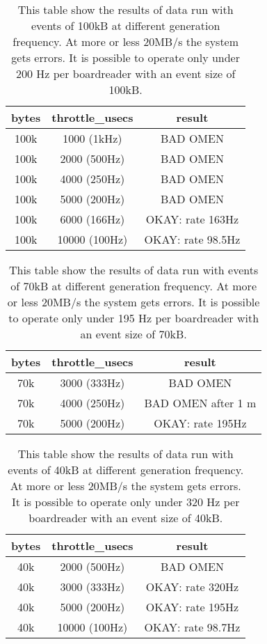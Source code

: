\documentclass[12pt]{article}
\begin{document}
\begin{center}  
\begin{table}[!h]
\centering
\begin{tabular}{c c c}
\hline
bytes & throttle\_usecs &  result\\
\hline
100k & 1000 (1kHz) & BAD OMEN \\
100k & 2000 (500Hz) & BAD OMEN \\
100k & 4000 (250Hz) & BAD OMEN \\
100k & 5000 (200Hz) & BAD OMEN \\
100k & 6000 (166Hz) & OKAY: rate 163Hz \\
100k & 10000 (100Hz) & OKAY: rate 98.5Hz \\
\end{tabular}
\caption{This table show the results of data run with events of 100kB at different generation frequency. At more or less 20MB/s the system gets errors. It is possible to operate only under 200 Hz per boardreader with an event size of 100kB.}
\end{table}\label{tab:upperlimits}
\end{center}

\begin{center}  
\begin{table}[!h]
\centering
\begin{tabular}{c c c}
\hline
bytes & throttle\_usecs &  result\\
\hline
70k & 3000 (333Hz) & BAD OMEN  \\

70k & 4000 (250Hz) & BAD OMEN after 1 m  \\

70k & 5000 (200Hz) & OKAY: rate 195Hz  \\
\end{tabular}
\caption{This table show the results of data run with events of 70kB at different generation frequency. At more or less 20MB/s the system gets errors. It is possible to operate only under 195 Hz per boardreader with an event size of 70kB.}
\end{table}\label{tab:upperlimits}
\end{center}

\begin{center}  
\begin{table}[!h]
\centering
\begin{tabular}{c c c}
\hline
bytes & throttle\_usecs &  result\\
\hline
40k & 2000 (500Hz) & BAD OMEN  \\
40k & 3000 (333Hz) & OKAY: rate 320Hz  \\
40k & 5000 (200Hz) & OKAY: rate 195Hz  \\
40k & 10000 (100Hz) & OKAY: rate 98.7Hz \\
\end{tabular}
\caption{This table show the results of data run with events of 40kB at different generation frequency. At more or less 20MB/s the system gets errors. It is possible to operate only under 320 Hz per boardreader with an event size of 40kB.}
\end{table}\label{tab:upperlimits}
\end{center}
\end{document}
